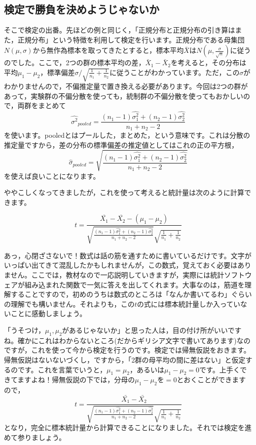 \documentclass{ltjsbook}
\begin{document}
\subsection{検定で勝負を決めようじゃないか}
そこで検定の出番。先ほどの例と同じく，「正規分布と正規分布の引き算はまた，正規分布」という特徴を利用して検定を行います。正規分布である母集団$N(\mu,\sigma)$から無作為標本を取ってきたとすると，標本平均$\bar{X}$は$N(\mu,\frac{\sigma}{\sqrt{n}})$に従うのでした。ここで，2つの群の標本平均の差，$\bar{X}_1 - \bar{X}_2$を考えると，その分布は平均$\mu_1-\mu_2$，標準偏差$\sigma/\sqrt{\frac{1}{n_1}+\frac{1}{n_2}}$に従うことがわかっています。ただ，この$\sigma$がわかりませんので，不偏推定量で置き換える必要があります。今回は2つの群があって，実験群の不偏分散を使っても，統制群の不偏分散を使ってもおかしいので，両群をまとめて
\[ \hat{\sigma^2}_{pooled} = \frac{(n_1-1)\hat{\sigma_1^2}+(n_2-1)\hat{\sigma_2^2}}{n_1+n_2 - 2}\]
を使います。pooledとはプールした，まとめた，という意味です。これは分散の推定量ですから，差の分布の標準偏差の推定値としてはこれの正の平方根，
\[ \hat{\sigma}_{pooled} = \sqrt{\frac{(n_1-1)\hat{\sigma_1^2}+(n_2-1)\hat{\sigma_2^2}}{n_1+n_2 - 2}}\]を使えば良いことになります。

ややこしくなってきましたが，これを使って考えると統計量は次のように計算できます。

\[ t = \frac{\bar{X_1}-\bar{X_2}-(\mu_1-\mu_2)}{\sqrt{\frac{(n_1-1)\hat{\sigma_1^2}+(n_2-1)\hat{\sigma_2^2}}{n_1+n_2 - 2}}\sqrt{\frac{1}{n_1}+\frac{1}{n_2}}}\]

あっ，心閉ざさないで！数式は話の筋を通すために書いているだけです。文字がいっぱい出てきて混乱したかもしれませんが，この数式，覚えておく必要はありません。ここでは，教材なので一応説明していきますが，実際には統計ソフトウェアが組み込まれた関数で一気に答えを出してくれます。大事なのは，筋道を理解することですので，初めのうちは数式のところは「なんか書いてるわ」ぐらいの理解でも構いません。それよりも，この$t$の式には標本統計量しか入っていないことに感動しましょう。

「うそつけ，$\mu_1,\mu_2$があるじゃないか」と思った人は，目の付け所がいいですね。確かにこれはわからないところ(だからギリシア文字で書いてあります)なのですが，これを使って今から検定を行うのです。検定では帰無仮説をおきます。帰無仮説はないないづくし，ですから，「2群の母平均の間に差はない」と仮定するのです。これを言葉でいうと，$\mu_1=\mu_2$，あるいは$\mu_1-\mu_2=0$です。上手くできてますよね！帰無仮説の下では，分母の$\mu_1-\mu_2$を$=0$とおくことができますので，
\[ t = \frac{\bar{X_1}-\bar{X_2}}{\sqrt{\frac{(n_1-1)\hat{\sigma_1^2}+(n_2-1)\hat{\sigma_2^2}}{n_1+n_2 - 2}}\sqrt{\frac{1}{n_1}+\frac{1}{n_2}}}\]
となり，完全に標本統計量から計算できることになりました。それでは検定を進めて参りましょう。
\end{document}
